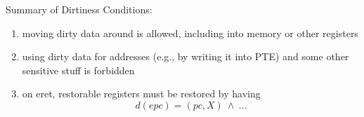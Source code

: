 \documentclass{beamer}
\begin{document}
\begin{frame} 
Summary of Dirtiness Conditions:
\begin{enumerate} 
	\item moving dirty data around is allowed, including into memory or other registers 
	\item using dirty data for addresses (e.g., by writing it into PTE) and some other sensitive stuff is forbidden
	\item on eret, restorable registers must be restored by having 
	\[ d(epc) = (pc,X) \ \land \ \ldots \]
\end{enumerate}
\end{frame} 

\end{document}

